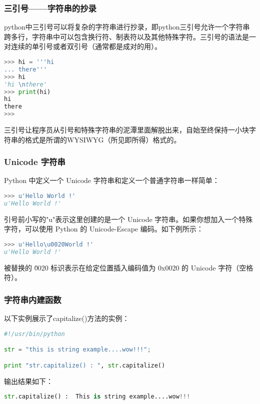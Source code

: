 \subsubsection{三引号——字符串的抄录}
python中三引号可以将复杂的字符串进行抄录，即python三引号允许一个字符串跨多行，字符串中可以包含换行符、制表符以及其他特殊字符。三引号的语法是一对连续的单引号或者双引号（通常都是成对的用）。
\begin{lstlisting}[language=Python]
>>> hi = '''hi 
... there'''
>>> hi
'hi \nthere'
>>> print(hi)
hi 
there
>>> 
\end{lstlisting}

三引号让程序员从引号和特殊字符串的泥潭里面解脱出来，自始至终保持一小块字符串的格式是所谓的WYSIWYG（所见即所得）格式的。


\subsubsection{Unicode 字符串}
Python 中定义一个 Unicode 字符串和定义一个普通字符串一样简单：
\begin{lstlisting}[language=Python]
>>> u'Hello World !'
u'Hello World !'
\end{lstlisting}

引号前小写的"u"表示这里创建的是一个 Unicode 字符串。如果你想加入一个特殊字符，可以使用 Python 的 Unicode-Escape 编码。如下例所示：
\begin{lstlisting}[language=Python]
>>> u'Hello\u0020World !'
u'Hello World !'
\end{lstlisting}
被替换的 \u0020 标识表示在给定位置插入编码值为 0x0020 的 Unicode 字符（空格符）。


\subsubsection{字符串内建函数}
 以下实例展示了capitalize()方法的实例：
\begin{lstlisting}[language=Python]
#!/usr/bin/python

str = "this is string example....wow!!!";

print "str.capitalize() : ", str.capitalize()
\end{lstlisting}
输出结果如下：
\begin{lstlisting}[language=Python]
str.capitalize() :  This is string example....wow!!!
\end{lstlisting}


